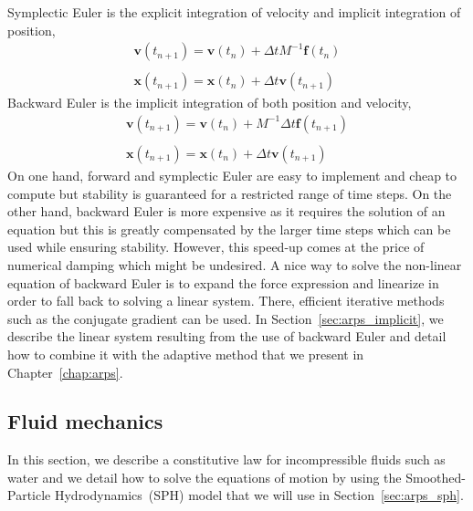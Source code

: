 Symplectic Euler is the explicit integration of velocity and implicit integration of position,
\begin{equation}
\label{eq:symplecticEuler}
\begin{array}{l}
\displaystyle \mathbf{v}(t_{n+1}) = \mathbf{v}(t_{n}) + \Delta t M^{-1} \mathbf{f}(t_{n}) \\ \\
\displaystyle \mathbf{x}(t_{n+1}) = \mathbf{x}(t_{n}) + \Delta t \mathbf{v}(t_{n+1})
\end{array}
\end{equation}
Backward Euler is the implicit integration of both position and velocity,
\begin{equation}
\label{eq:backwardEuler}
\begin{array}{ll}
\displaystyle \mathbf{v}(t_{n+1}) = \mathbf{v}(t_{n}) + M^{-1}\Delta t \mathbf{f}(t_{n+1}) \\ \\
\displaystyle \mathbf{x}(t_{n+1}) = \mathbf{x}(t_{n}) + \Delta t \mathbf{v}(t_{n+1})
\end{array}
\end{equation}
On one hand, forward and symplectic Euler are easy to implement and cheap to compute but stability is guaranteed for a restricted range of time steps. 
On the other hand, backward Euler is more expensive as it requires the solution of an equation but this is greatly compensated by the larger time steps which can be used while ensuring stability.
However, this speed-up comes at the price of numerical damping which might be undesired.
A nice way to solve the non-linear equation of backward Euler is to expand the force expression and linearize in order to fall back to solving a linear system. There, efficient iterative methods such as the conjugate gradient can be used.
In Section~\ref{sec:arps_implicit}, we describe the linear system resulting from the use of backward Euler and detail how to combine it with the adaptive method that we present in Chapter~\ref{chap:arps}.

\subsection{Fluid mechanics}
\label{subsec:fluidMechanics}
In this section, we describe a constitutive law for incompressible fluids such as water and we detail how to solve the equations of motion by using the Smoothed-Particle Hydrodynamics~(SPH) model that we will use in Section~\ref{sec:arps_sph}.
